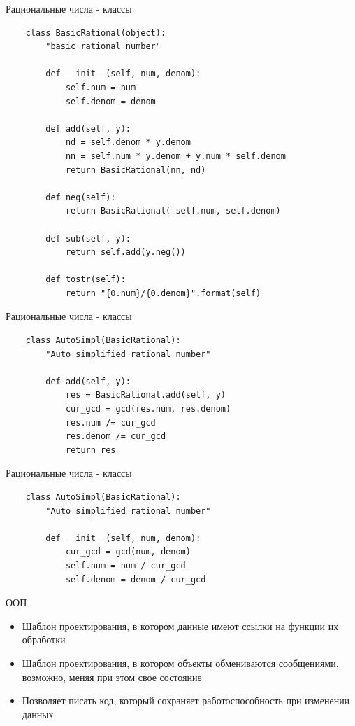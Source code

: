 \documentclass{article}
\begin{document}
\begin{center} Рациональные числа - классы \end{center}
\begin{lstlisting}
    class BasicRational(object):
        "basic rational number"

        def __init__(self, num, denom):
            self.num = num
            self.denom = denom

        def add(self, y):
            nd = self.denom * y.denom
            nn = self.num * y.denom + y.num * self.denom
            return BasicRational(nn, nd)

        def neg(self):
            return BasicRational(-self.num, self.denom)

        def sub(self, y):
            return self.add(y.neg())

        def tostr(self):
            return "{0.num}/{0.denom}".format(self)
\end{lstlisting}
\newpage

\begin{center} Рациональные числа - классы \end{center}
\begin{lstlisting}
    class AutoSimpl(BasicRational):
        "Auto simplified rational number"

        def add(self, y):
            res = BasicRational.add(self, y)
            cur_gcd = gcd(res.num, res.denom)
            res.num /= cur_gcd
            res.denom /= cur_gcd
            return res
\end{lstlisting}
\newpage

\begin{center} Рациональные числа - классы \end{center}
\begin{lstlisting}
    class AutoSimpl(BasicRational):
        "Auto simplified rational number"
    
        def __init__(self, num, denom):
            cur_gcd = gcd(num, denom)
            self.num = num / cur_gcd
            self.denom = denom / cur_gcd
\end{lstlisting}
\newpage

\begin{center} ООП \end{center}
\begin{itemize}
    \item Шаблон проектирования, в котором данные имеют ссылки на функции их обработки
    \item Шаблон проектирования, в котором объекты обмениваются сообщениями, возможно,
          меняя при этом свое состояние
    \item Позволяет писать код, который сохраняет работоспособность при изменении данных
\end{itemize}
\newpage
\end{document}
